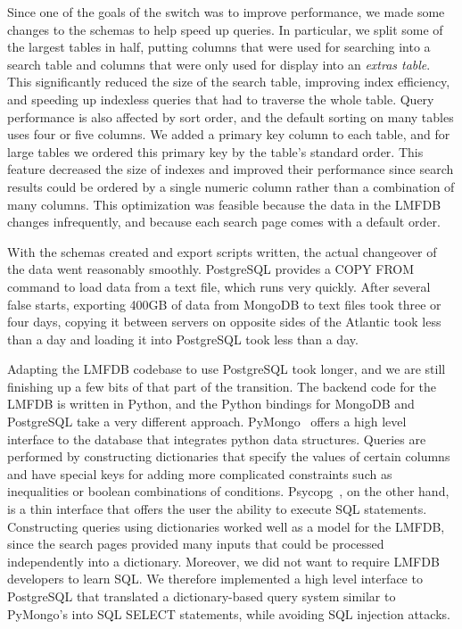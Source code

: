 \documentclass{amsart}
\begin{document}
Since one of the goals of the switch was to improve performance, we made some changes to the schemas to help speed up queries.
In particular, we split some of the largest tables in half, putting columns that were used for searching into a search table and columns that were only used for display into an \emph{extras table}.
This significantly reduced the size of the search table, improving index efficiency, and speeding up indexless queries that had to traverse the whole table.
Query performance is also affected by sort order, and the default sorting on many tables uses four or five columns.
We added a primary key column to each table, and for large tables we ordered this primary key by the table's standard order.
This feature decreased the size of indexes and improved their performance since search results could be ordered by a single numeric column rather than a combination of many columns.
This optimization was feasible because the data in the LMFDB changes infrequently, and because each search page comes with a default order.

With the schemas created and export scripts written, the actual changeover of the data went reasonably smoothly.
PostgreSQL provides a COPY FROM command to load data from a text file, which runs very quickly.
After several false starts, exporting 400GB of data from MongoDB to text files took three or four days, copying it between servers on opposite sides of the Atlantic took less than a day and loading it into PostgreSQL took less than a day.

Adapting the LMFDB codebase to use PostgreSQL took longer, and we are still finishing up a few bits of that part of the transition.
The backend code for the LMFDB is written in Python, and the Python bindings for MongoDB and PostgreSQL take a very different approach.
PyMongo~\cite{pymongo} offers a high level interface to the database that integrates python data structures.
Queries are performed by constructing dictionaries that specify the values of certain columns and have special keys for adding more complicated constraints such as inequalities or boolean combinations of conditions.
Psycopg~\cite{psycopg}, on the other hand, is a thin interface that offers the user the ability to execute SQL statements.
Constructing queries using dictionaries worked well as a model for the LMFDB, since the search pages provided many inputs that could be processed independently into a dictionary.
Moreover, we did not want to require LMFDB developers to learn SQL.
We therefore implemented a high level interface to PostgreSQL that translated a dictionary-based query system similar to PyMongo's into SQL SELECT statements, while avoiding SQL injection attacks.
\end{document}
